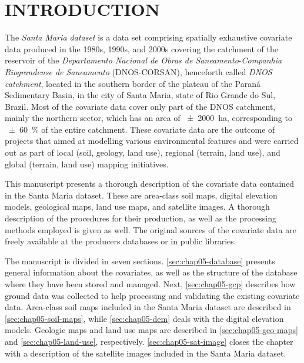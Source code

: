 \formatchapter

\section{INTRODUCTION}
\label{sec:chap05-intro}

The \emph{Santa Maria dataset} is a data set comprising spatially exhaustive covariate data produced in the 
1980s, 1990s, and 2000s covering the catchment of the reservoir of the \textit{Departamento Nacional de Obras 
de Saneamento}-\textit{Companhia Riograndense de Saneamento} (DNOS-CORSAN), henceforth called \emph{DNOS 
catchment}, located in the southern border of the plateau of the Paraná Sedimentary Basin, in the city of 
Santa Maria, state of Rio Grande do Sul, Brazil. Most of the covariate data cover only part of the DNOS 
catchment, mainly the northern sector, which has an area of \SI{\pm2000}{\hectare}, corresponding to 
\SI{\pm60}{\percent} of the entire catchment. These covariate data are the outcome of projects that aimed at 
modelling various environmental features and were carried out as part of local (soil, geology, land use), 
regional (terrain, land use), and global (terrain, land use) mapping initiatives.

This manuscript presents a thorough description of the covariate data contained in the Santa Maria dataset. 
These are area-class soil maps, digital elevation models, geological maps, land use maps, and satellite 
images. A thorough description of the procedures for their production, as well as the processing methods 
employed is given as well. The original sources of the covariate data are freely available at the producers 
databases or in public libraries.

The manuscript is divided in seven sections. \autoref{sec:chap05-database} presents general information about 
the covariates, as well as the structure of the database where they have been stored and managed. Next, 
\autoref{sec:chap05-gcp} describes how ground data was collected to help processing and validating the 
existing covariate data. Area-class soil maps included in the Santa Maria dataset are described in 
\autoref{sec:chap05-soil-maps}, while \autoref{sec:chap05-dem} deals with the digital elevation models. 
Geologic maps and land use maps are described in \autoref{sec:chap05-geo-maps} and 
\autoref{sec:chap05-land-use}, respectively. \autoref{sec:chap05-sat-image} closes the chapter with a 
description of the satellite images included in the Santa Maria dataset.

